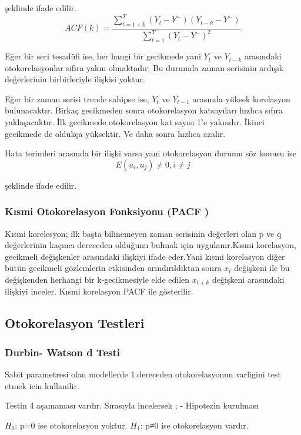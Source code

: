 \documentclass[11pt]{article}
\begin{document}
şeklinde ifade edilir.
\[  ACF(k) = \frac{\sum_{t=1+k}^T (Y_{t}- Y^-)(Y_{t-k}- Y^-)}{\sum_{t=1}^T (Y_{t}- Y^-)^2 }  \]

Eğer bir seri tesadüfi ise, her hangi bir gecikmede yani \(Y_{t}\) ve
\(Y_{t-k}\) arasındaki otokorelasyonlar sıfıra yakın olmaktadır. Bu
durumda zaman serisinin ardışık değerlerinin birbirleriyle ilişkisi
yoktur.

Eğer bir zaman serisi trende sahipse ise, \(Y_{t}\) ve \(Y_{t-1}\)
arasında yüksek korelasyon bulunacaktır. Birkaç gecikmeden sonra
otokorelasyon katsayıları hızlıca sıfıra yaklaşacaktır. İlk gecikmede
otokorelasyon kat sayısı 1'e yakındır. İkinci gecikmede de oldukça
yüksektir. Ve daha sonra hızlıca azalır.

Hata terimleri arasında bir ilişki varsa yani otokorelasyon durumu söz
konusu ise \[ E(u_{i},u_{j})≠0, i≠j \]

şeklinde ifade edilir.

\subsubsection{Kısmi Otokorelasyon Fonksiyonu (PACF
)}\label{kux131smi-otokorelasyon-fonksiyonu-pacf}

Kısmi korelesyon; ilk başta bilinemeyen zaman serisinin değerleri olan p
ve q değerlerinin kaçıncı dereceden olduğunu bulmak için uygulanır.Kısmi
korelasyon, gecikmeli değişkenler arasındaki ilişkiyi ifade eder.Yani
kısmi korelasyon diğer bütün gecikmeli gözlemlerin etkisinden
arındırıldıktan sonra \(x_{t}\) değişkeni ile bu değişkenden herhangi
bir k-gecikmesiyle elde edilen \(x_{t+k}\) değişkeni arasındaki ilişkiyi
inceler. Kısmi korelasyon PACF ile gösterilir.

\subsection{Otokorelasyon Testleri}\label{otokorelasyon-testleri}

\subsubsection{Durbin- Watson d Testi}\label{durbin--watson-d-testi}

Sabit parametresi olan modellerde 1.dereceden otokorelasyonun varligini
test etmek icin kullanilir.

Testin 4 aşamaması vardır. Sırasıyla incelersek ; - Hipotezin kurulması

\(H_{0}\): p=0 ise otokorelasyon yoktur. \(H_{1}\): p≠0 ise
otokorelasyon vardır.
\end{document}
